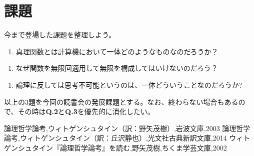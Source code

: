 \documentclass[a4paper,onecolumn,article]{jarticle}
\newcounter{ct}               %
\begin{document}
\section{課題}

今まで登場した課題を整理しよう。

\setcounter{ct}{1}
\begin{enumerate}
  \item 真理関数とは計算機において一体どのようなものなのだろうか？
\end{enumerate}

\begin{enumerate}
  \item なぜ関数を無限回適用して無限を構成してはいけないのだろう？
\end{enumerate}

\begin{enumerate}
  \item 論理に反しては思考不可能というのは、一体どういうことなのだろうか?
\end{enumerate}

以上の3題を今回の読書会の発展課題とする。なお、終わらない場合もあるので、その時は{\bf{Q.2}}と{\bf{Q.3}}を優先的に消化したい。


\begin{thebibliography}{9}
   論理哲学論考,ウィトゲンシュタイン（訳：野矢茂樹）,岩波文庫,2003
   論理哲学論考,ウィトゲンシュタイン（訳：丘沢静也）,光文社古典新訳文庫,2014
   ウィトゲンシュタイン『論理哲学論考』を読む,野矢茂樹,ちくま学芸文庫,2002
\end{thebibliography}
\end{document}
